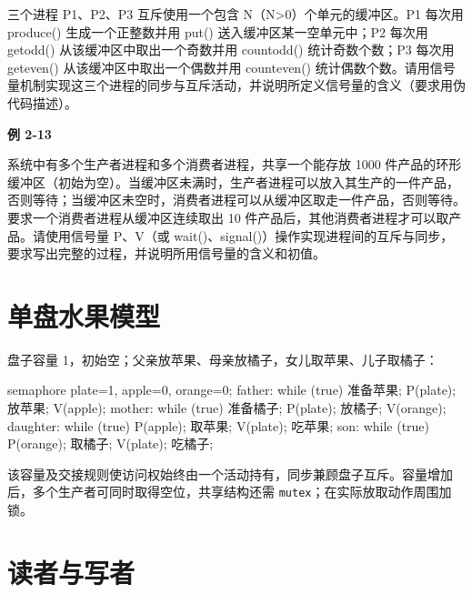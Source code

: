 三个进程 P1、P2、P3 互斥使用一个包含 N（N\textgreater0）个单元的缓冲区。P1 每次用 produce() 生成一个正整数并用 put() 送入缓冲区某一空单元中；P2 每次用 getodd() 从该缓冲区中取出一个奇数并用 countodd() 统计奇数个数；P3 每次用 geteven() 从该缓冲区中取出一个偶数并用 counteven() 统计偶数个数。请用信号量机制实现这三个进程的同步与互斥活动，并说明所定义信号量的含义（要求用伪代码描述）。

\par\medskip{}\noindent\hypertarget{OS02-E13}{}\label{OS02-E13}\textbf{例 2-13}\par\nobreak\smallskip

系统中有多个生产者进程和多个消费者进程，共享一个能存放 1000 件产品的环形缓冲区（初始为空）。当缓冲区未满时，生产者进程可以放入其生产的一件产品，否则等待；当缓冲区未空时，消费者进程可以从缓冲区取走一件产品，否则等待。要求一个消费者进程从缓冲区连续取出 10 件产品后，其他消费者进程才可以取产品。请使用信号量 P、V（或 wait()、signal()）操作实现进程间的互斥与同步，要求写出完整的过程，并说明所用信号量的含义和初值。

\section{单盘水果模型}\label{OS02-fruit}

盘子容量 1，初始空；父亲放苹果、母亲放橘子，女儿取苹果、儿子取橘子：

\par\smallskip\noindent\begin{minipage}{\linewidth}
\begin{codeblock}[language={}]
semaphore plate=1, apple=0, orange=0;
father:   while (true) { 准备苹果; P(plate); 放苹果; V(apple); }
mother:   while (true) { 准备橘子; P(plate); 放橘子; V(orange); }
daughter: while (true) { P(apple); 取苹果; V(plate); 吃苹果; }
son:      while (true) { P(orange); 取橘子; V(plate); 吃橘子; }
\end{codeblock}
\end{minipage}\par\smallskip

该容量及交接规则使访问权始终由一个活动持有，同步兼顾盘子互斥。容量增加后，多个生产者可同时取得空位，共享结构还需 \texttt{mutex}；在实际放取动作周围加锁。

\section{读者与写者}\label{OS02-readers}

